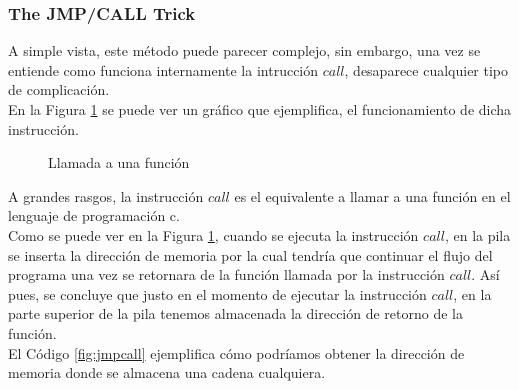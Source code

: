 \documentclass [titlepage, 12pt]{article}
\begin{document}
\subsubsection{The JMP/CALL Trick}
A simple vista, este m\'etodo puede parecer complejo, sin embargo, una vez se entiende como funciona internamente la intrucci\'on $call$, desaparece cualquier tipo de complicaci\'on. \\
En la Figura \ref{fig:llamadaFuncion}  se puede ver un gr\'afico que ejemplifica, el funcionamiento de dicha instrucci\'on.

\begin{figure}[!hbp]
	\caption{Llamada a una funci\'on}
    \label{fig:llamadaFuncion}  
    \centering
    \addtolength{\abovecaptionskip}{-12pt}    
\end{figure}


A grandes rasgos, la instrucci\'on $call$ es el equivalente a llamar a una funci\'on en el lenguaje de programaci\'on c.\\
Como se puede ver en la Figura \ref{fig:llamadaFuncion}, cuando se ejecuta la instrucci\'on $call$, en la pila se inserta la direcci\'on de memoria por la cual tendr\'ia que continuar el flujo del programa una vez se retornara de la funci\'on llamada por la instrucci\'on $call$. As\'i pues, se concluye que justo en el momento de ejecutar la instrucci\'on $call$, en la parte superior de la pila tenemos almacenada la direcci\'on de retorno de la funci\'on.\\
El C\'odigo \ref{fig:jmpcall} ejemplifica c\'omo podr\'iamos obtener la direcci\'on de memoria donde se almacena una cadena cualquiera.
\end{document}
